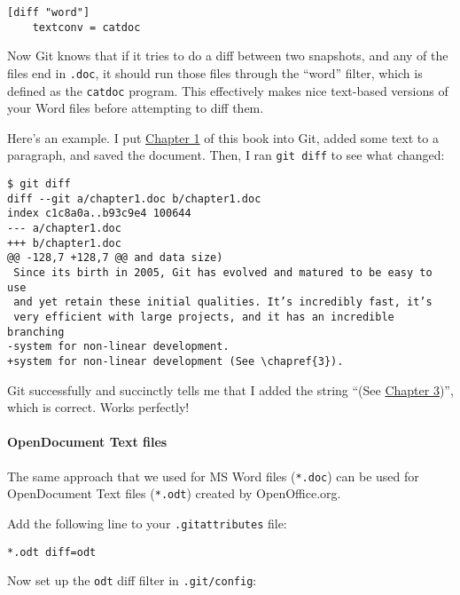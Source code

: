 \documentclass[a4paper]{book}
\newcommand{\prechap}{Chapter }
\newcommand{\postchap}{}
\newcommand{\chapref}[1]{\hyperref[chap:#1]{\prechap #1\postchap}}
\begin{document}
\begin{shaded}\begin{verbatim}
[diff "word"]
	textconv = catdoc
\end{verbatim}\end{shaded}

Now Git knows that if it tries to do a diff between two snapshots, and any of the files end in \texttt{.doc}, it should run those files through the “word” filter, which is defined as the \texttt{catdoc} program. This effectively makes nice text-based versions of your Word files before attempting to diff them.

Here's an example. I put \chapref{1} of this book into Git, added some text to a paragraph, and saved the document. Then, I ran \texttt{git diff} to see what changed:

\begin{shaded}\begin{verbatim}
$ git diff
diff --git a/chapter1.doc b/chapter1.doc
index c1c8a0a..b93c9e4 100644
--- a/chapter1.doc
+++ b/chapter1.doc
@@ -128,7 +128,7 @@ and data size)
 Since its birth in 2005, Git has evolved and matured to be easy to use
 and yet retain these initial qualities. It’s incredibly fast, it’s
 very efficient with large projects, and it has an incredible branching
-system for non-linear development.
+system for non-linear development (See \chapref{3}).
\end{verbatim}\end{shaded}

Git successfully and succinctly tells me that I added the string “(See \chapref{3})”, which is correct. Works perfectly!

\paragraph{OpenDocument Text files}

The same approach that we used for MS Word files (\texttt{*.doc}) can be used for OpenDocument Text files (\texttt{*.odt}) created by OpenOffice.org.

Add the following line to your \texttt{.gitattributes} file:

\begin{shaded}\begin{verbatim}
*.odt diff=odt
\end{verbatim}\end{shaded}

Now set up the \texttt{odt} diff filter in \texttt{.git/config}:
\end{document}
